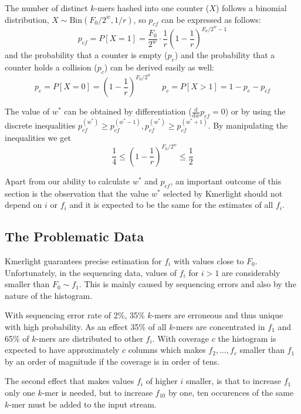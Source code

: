The number of distinct $k$-mers hashed into one counter ($X$) follows a binomial distribution, $X \sim \mathrm{Bin}(F_0/2^w, 1/r)$, so $p_{cf}$ can be expressed as follows:
\begin{equation} \label{eq:pcf}
p_{cf} = P[X=1] = \frac{F_0}{2^w} \cdot \frac{1}{r} \left(1 - \frac{1}{r}\right)^{F_0/2^w - 1}
\end{equation}
and the probability that a counter is empty ($p_e$) and the probability that a counter holds a collision ($p_c$) can be derived easily as well:
$$p_e = P[X=0] = \left(1 - \frac{1}{r}\right)^{F_0/2^w} ~~~~~~ p_c = P[X>1] = 1 - p_e - p_{cf}$$

The value of $w^*$ can be obtained by differentiation ($\frac{\mathrm{d}}{\mathrm{d}w}p_{cf} = 0$) or by using the discrete inequalities 
$p_{cf}^{(w^*)} \geq p_{cf}^{(w^*-1)}, p_{cf}^{(w^*)} \geq p_{cf}^{(w^*+1)}$. 
By manipulating the inequalities we get
\begin{equation} \label{eq:wstarbounds}
\frac{1}{4} \leq \left(1 - \frac{1}{r}\right)^{F_0/2^w} \leq \frac{1}{2}
\end{equation}

\medskip

Apart from our ability to calculate $w^*$ and $p_{cf}$, an important outcome of
this section is the observation that the value $w^*$ selected by Kmerlight should not
depend on $i$ or $f_i$ and it is expected to be the same for the estimates of all $f_i$.

\subsection{The Problematic Data}
Kmerlight guarantees precise estimation for $f_i$ with values close to $F_0$.
Unfortunately, in the sequencing data, values of $f_i$ for $i > 1$ are considerably 
smaller than $F_0 \sim f_1$. This is mainly caused by sequencing errors and also
by the nature of the histogram.

With sequencing error rate of 2\%, 35\% $k$-mers are erroneous and thus unique with high probability.
As an effect 35\% of all $k$-mers are concentrated in $f_1$ and 65\% of $k$-mers are
distributed to other $f_i$. With coverage $c$ the histogram is expected to have 
approximately $c$ columns which makes $f_2, \dots, f_c$ smaller than $f_1$ by an order of magnitude if the coverage is in order of tens.

The second effect that makes values $f_i$ of higher $i$ smaller, is that to increase 
$f_1$ only one $k$-mer is needed, but to increase $f_{10}$ by one, ten occurences of
 the same $k$-mer must be added to the input stream.

